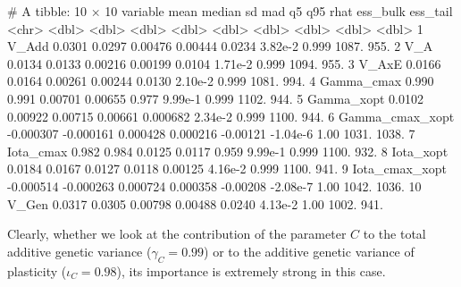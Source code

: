 \documentclass[a4paper,12pt,twoside]{article}
\begin{document}
\begin{Routput}
# A tibble: 10 × 10
   variable             mean    median       sd      mad        q5       q95  rhat ess_bulk ess_tail
   <chr>               <dbl>     <dbl>    <dbl>    <dbl>     <dbl>     <dbl> <dbl>    <dbl>    <dbl>
 1 V_Add            0.0301    0.0297   0.00476  0.00444   0.0234     3.82e-2 0.999    1087.     955.
 2 V_A              0.0134    0.0133   0.00216  0.00199   0.0104     1.71e-2 0.999    1094.     955.
 3 V_AxE            0.0166    0.0164   0.00261  0.00244   0.0130     2.10e-2 0.999    1081.     994.
 4 Gamma_cmax       0.990     0.991    0.00701  0.00655   0.977      9.99e-1 0.999    1102.     944.
 5 Gamma_xopt       0.0102    0.00922  0.00715  0.00661   0.000682   2.34e-2 0.999    1100.     944.
 6 Gamma_cmax_xopt -0.000307 -0.000161 0.000428 0.000216 -0.00121   -1.04e-6 1.00     1031.    1038.
 7 Iota_cmax        0.982     0.984    0.0125   0.0117    0.959      9.99e-1 0.999    1100.     932.
 8 Iota_xopt        0.0184    0.0167   0.0127   0.0118    0.00125    4.16e-2 0.999    1100.     941.
 9 Iota_cmax_xopt  -0.000514 -0.000263 0.000724 0.000358 -0.00208   -2.08e-7 1.00     1042.    1036.
10 V_Gen            0.0317    0.0305   0.00798  0.00488   0.0240     4.13e-2 1.00     1002.     941.
\end{Routput}
Clearly, whether we look at the contribution of the parameter $C$ to the total additive genetic variance ($\gamma_{C}=0.99$) or to the additive genetic variance of plasticity ($\iota_{C}=0.98$), its importance is extremely strong in this case.
\end{document}
